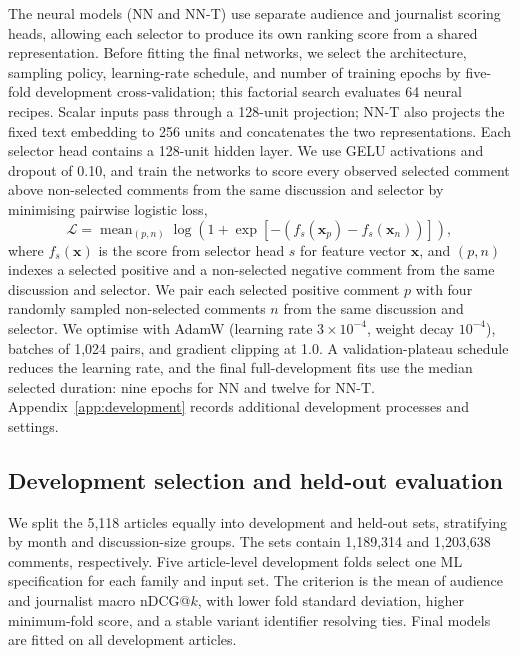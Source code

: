The neural models (NN and NN-T) use separate audience and journalist scoring heads, allowing each selector to produce its own ranking score from a shared representation. Before fitting the final networks, we select the architecture, sampling policy, learning-rate schedule, and number of training epochs by five-fold development cross-validation; this factorial search evaluates 64 neural recipes. Scalar inputs pass through a 128-unit projection; NN-T also projects the fixed text embedding to 256 units and concatenates the two representations. Each selector head contains a 128-unit hidden layer. We use GELU activations and dropout of 0.10, and train the networks to score every observed selected comment above non-selected comments from the same discussion and selector by minimising pairwise logistic loss,
\begin{equation}
\mathcal{L}=\operatorname{mean}_{(p,n)}\log\!\left(1+\exp[-(f_s(\boldsymbol{x}_p)-f_s(\boldsymbol{x}_n))]\right),
\end{equation}
where $f_s(\boldsymbol{x})$ is the score from selector head $s$ for feature vector $\boldsymbol{x}$, and $(p,n)$ indexes a selected positive and a non-selected negative comment from the same discussion and selector.
We pair each selected positive comment $p$ with four randomly sampled non-selected comments $n$ from the same discussion and selector. We optimise with AdamW (learning rate $3\times10^{-4}$, weight decay $10^{-4}$), batches of 1,024 pairs, and gradient clipping at 1.0.  A validation-plateau schedule reduces the learning rate, and the final full-development fits use the median selected duration: nine epochs for NN and twelve for NN-T. Appendix~\ref{app:development} records additional development processes and settings.

\subsection{Development selection and held-out evaluation}
We split the 5,118 articles equally into development and held-out sets, stratifying by month and discussion-size groups. The sets contain 1,189,314 and 1,203,638 comments, respectively. Five article-level development folds select one ML specification for each family and input set. The criterion is the mean of audience and journalist macro nDCG@$k$, with lower fold standard deviation, higher minimum-fold score, and a stable variant identifier resolving ties. Final models are fitted on all development articles.

